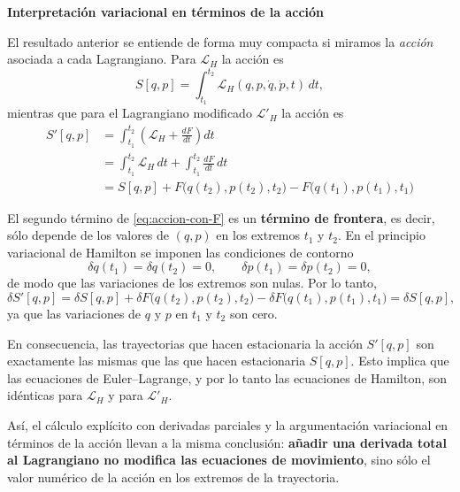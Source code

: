 \documentclass{article}
\begin{document}
\vspace{0.5cm}
\textcolor{trueblue}{\textbf{Interpretación variacional en términos de la acción}}

El resultado anterior se entiende de forma muy compacta si miramos la \emph{acción}
asociada a cada Lagrangiano. Para $\mathcal{L}_{H}$ la acción es
\[
S[q,p] = \int_{t_{1}}^{t_{2}} \mathcal{L}_{H}(q,p,\dot q,\dot p,t)\,dt,
\]
mientras que para el Lagrangiano modificado $\mathcal{L}'_{H}$ la acción es
\begin{equation}
\begin{split}
S'[q,p]
&= \int_{t_{1}}^{t_{2}}
    \left(
      \mathcal{L}_{H}
      + \frac{dF}{dt}
    \right) dt \\[4pt]
&= \int_{t_{1}}^{t_{2}} \mathcal{L}_{H}\,dt
   + \int_{t_{1}}^{t_{2}} \frac{dF}{dt}\,dt \\[4pt]
&= S[q,p]
   + F\bigl(q(t_{2}),p(t_{2}),t_{2}\bigr)
   - F\bigl(q(t_{1}),p(t_{1}),t_{1}\bigr)
\end{split}
\label{eq:accion-con-F}
\end{equation}

El segundo término de \eqref{eq:accion-con-F} es un \textbf{término de frontera},
es decir, sólo depende de los valores de $(q,p)$ en los extremos $t_{1}$ y $t_{2}$.
En el principio variacional de Hamilton se imponen las condiciones de contorno
\[
\delta q(t_{1}) = \delta q(t_{2}) = 0,
\qquad
\delta p(t_{1}) = \delta p(t_{2}) = 0,
\]
de modo que las variaciones de los extremos son nulas. Por lo tanto,
\[
\delta S'[q,p]
= \delta S[q,p]
+ \delta F\bigl(q(t_{2}),p(t_{2}),t_{2}\bigr)
- \delta F\bigl(q(t_{1}),p(t_{1}),t_{1}\bigr)
= \delta S[q,p],
\]
ya que las variaciones de $q$ y $p$ en $t_{1}$ y $t_{2}$ son cero.  

En consecuencia, las trayectorias que hacen estacionaria la acción $S'[q,p]$
son exactamente las mismas que las que hacen estacionaria $S[q,p]$. Esto implica
que las ecuaciones de Euler–Lagrange, y por lo tanto las ecuaciones de Hamilton,
son idénticas para $\mathcal{L}_{H}$ y para $\mathcal{L}'_{H}$.

\vspace{0.3cm}

Así, el cálculo explícito con derivadas parciales y la argumentación variacional
en términos de la acción llevan a la misma conclusión: \textbf{añadir una derivada
total al Lagrangiano no modifica las ecuaciones de movimiento}, sino sólo el valor
numérico de la acción en los extremos de la trayectoria.


\vspace{0.5cm}
\end{document}
